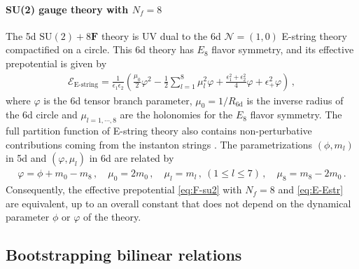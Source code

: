 \documentclass[11pt, a4paper]{article}
\theoremstyle{definition}
\begin{document}
\paragraph{SU(2) gauge theory with $ N_f = 8 $}
The 5d $ \mathrm{SU}(2)+8\mathbf{F} $ theory is UV dual to the 6d $ \mathcal{N}=(1,0) $ E-string theory compactified on a circle. This 6d theory has $ E_8 $ flavor symmetry, and its effective prepotential is given by \cite{Kim:2020hhh}
\begin{align}\label{eq:E-Estr}
    \mathcal{E}_{\text{E-string}} = \frac{1}{\epsilon_1 \epsilon_2} \left(  \frac{\mu_0}{2} \varphi^2 - \frac{1}{2} \sum_{l=1}^8 \mu_l^2 \varphi + \frac{\epsilon_1^2+\epsilon_2^2}{4} \varphi + \epsilon_+^2 \varphi \right) \, ,
\end{align}
where $ \varphi $ is the 6d tensor branch parameter, $ \mu_0 = 1/R_{\mathrm{6d}} $ is the inverse radius of the 6d circle and $ \mu_{l=1,\cdots,8} $ are the holonomies for the $ E_8 $ flavor symmetry. The full partition function of E-string theory also contains non-perturbative contributions coming from the instanton strings \cite{Kim:2014dza}. The parametrizations $ (\phi,m_l) $ in 5d and $ (\varphi, \mu_l) $ in 6d are related by
\begin{align}\label{eq:map-6d5d}
    \varphi = \phi+m_0-m_8 \, , \quad
    \mu_0 = 2m_0 \, , \quad
    \mu_l = m_l \, , \ (1 \leq l \leq 7) \, , \quad
    \mu_8 = m_8 - 2m_0 \, .
\end{align}
Consequently, the effective prepotential \eqref{eq:F-su2} with $ N_f=8 $ and \eqref{eq:E-Estr} are equivalent, up to an overall constant that does not depend on the dynamical parameter $ \phi $ or $ \varphi $ of the theory.



\subsection{Bootstrapping bilinear relations}
\end{document}
